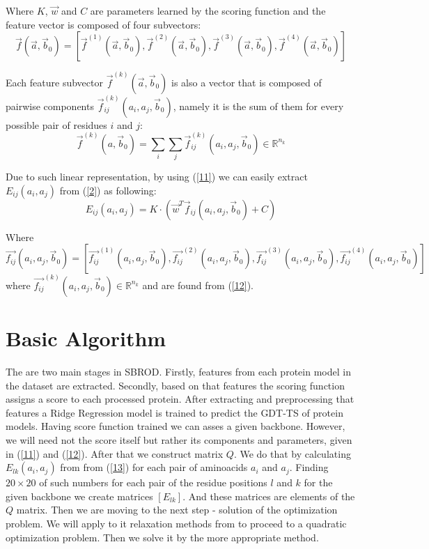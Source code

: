 \documentclass[12pt,twoside]{article}
\begin{document}
Where   $K$, $\vec{w}$ and $C$ are parameters learned by the scoring function and the feature vector is composed of four subvectors: 
$$
\vec{f}(\vec{a},\vec{b}_0)
=[\vec{f}^{(1)}(\vec{a},\vec{b}_0),
\vec{f}^{(2)}(\vec{a},\vec{b}_0),
\vec{f}^{(3)}(\vec{a},\vec{b}_0),
\vec{f}^{(4)}(\vec{a},\vec{b}_0)]
$$

Each feature subvector $\vec{f}^{(k)}(\vec{a},\vec{b}_0)$ is also a vector that is composed of pairwise components $\vec{f}^{(k)}_{ij}(a_i,a_j,\vec{b}_0)$, namely it is the sum of them for every possible pair of residues $i$ and  $j$:
\begin{equation}
\label{12}
\vec{f}^{(k)}(a,\vec{b}_0)
=\sum_i\sum_j \vec{f}^{(k)}_{ij}(a_i,a_j,\vec{b}_0)\in\mathbb{R}^{n_k}
\end{equation}

Due to such linear representation, by using (\ref{11}) we can easily extract $E_{ij}(a_i,a_j)$ from (\ref{2}) as following:
\begin{equation}
\label{13}
E_{ij}(a_i,a_j) = K\cdot(\vec{w}^T \vec{f}_{ij}(a_i, a_j,\vec{b}_0)+C)
\end{equation}

Where
$$
\vec{f_{ij}}(a_i, a_j,\vec{b}_0)
=[\vec{f_{ij}}^{(1)}(a_i, a_j,\vec{b}_0),
\vec{f_{ij}}^{(2)}(a_i, a_j,\vec{b}_0),
\vec{f_{ij}}^{(3)}(a_i, a_j,\vec{b}_0),
\vec{f_{ij}}^{(4)}(a_i, a_j,\vec{b}_0)]
$$
where $\vec{f_{ij}}^{(k)}(a_i, a_j,\vec{b}_0)\in\mathbb{R}^{n_k}$ and are found from (\ref{12}).
\section{Basic Algorithm}
 
The are two main stages in SBROD. Firstly, features from each protein model in the dataset are extracted. 
Secondly, based on that features the scoring function assigns a score to each processed protein. After extracting and preprocessing that features a Ridge Regression model is trained to predict the GDT-TS of protein models.
Having score function trained we can asses a given backbone. However, we will need not the score itself but rather its components and parameters, given in (\ref{11}) and (\ref{12}). 
After that we construct matrix $Q$. We do that by calculating $E_{lk}(a_i, a_j)$ from from (\ref{13}) for each pair of aminoacids $a_i$ and $a_j$. Finding $20\times20$ of such numbers for each pair of the residue positions $l$ and $k$ for the given backbone we create matrices $[E_{lk}]$. And these matrices are elements of the $Q$ matrix.
Then we are moving to the next step - solution of the optimization problem. We will apply to it relaxation methods from \cite{Riazanov:2016} to proceed to a quadratic optimization problem.
Then we solve it by the more appropriate method.
\end{document}
